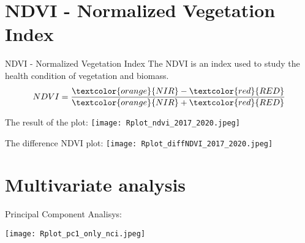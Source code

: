 \documentclass{beamer}
\begin{document}
\section{NDVI - Normalized Vegetation Index}
\begin{frame}{NDVI - Normalized Vegetation Index}
The NDVI is an index used to study the health condition of vegetation and biomass. 
\bigskip
\begin{equation}
    NDVI = \frac{\textcolor{orange}{NIR} - \textcolor{red}{RED}}{\textcolor{orange}{NIR} + \textcolor{red}{RED}}
\end{equation}
  \texttt{\scriptsize{}}
    
\end{frame}

\begin{frame}%
    The result of the plot: 
    \texttt{[image: Rplot\_ndvi\_2017\_2020.jpeg]}\\
\end{frame}

\begin{frame}
The difference NDVI plot:
\texttt{\scriptsize{}}
    \centering
    \texttt{[image: Rplot\_diffNDVI\_2017\_2020.jpeg]}\\
\end{frame}

\section{{Multivariate analysis}}
\begin{frame}{Principal Component Analisys: }
\texttt{\tiny{}}
\end{frame}

\begin{frame}%
\texttt{\tiny{}}
\end{frame}

\begin{frame}%
\texttt{\tiny{}}
\centering
    \texttt{[image: Rplot\_pc1\_only\_nci.jpeg]}\\
\end{frame}
\end{document}
